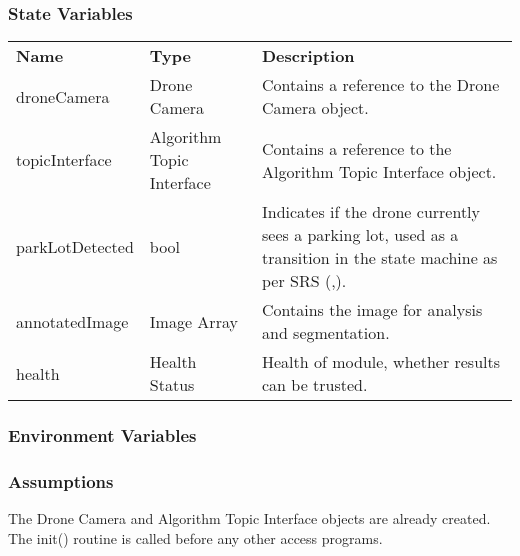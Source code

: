 \documentclass[12pt, titlepage]{article}
\begin{document}
\subsubsection{State Variables}
\begin{center}
\begin{tabular}{p{3 cm} p{4cm} p{5cm} }
\hline
\textbf{Name} & \textbf{Type} & \textbf{Description}  \\
droneCamera & Drone Camera & Contains a reference to the Drone Camera object. \\
topicInterface & Algorithm Topic Interface & Contains a reference to the Algorithm Topic Interface object.\\
parkLotDetected & bool & Indicates if the drone currently sees a parking lot, used as a transition in the state machine as per SRS (\nameref{TRANS_007},\nameref{TRANS_008}). \\
annotatedImage & Image Array & Contains the image for analysis and segmentation.   \\
health & Health Status & Health of module, whether results can be trusted.   \\
\hline
\hline
\end{tabular}
\end{center}
\subsubsection{Environment Variables}
\subsubsection{Assumptions}
The Drone Camera and Algorithm Topic Interface objects are already created.
The init() routine is called before any other access programs.
\end{document}
